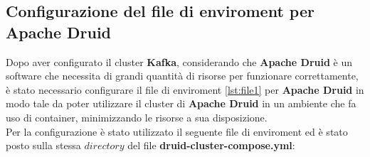 \subsection{Configurazione del file di enviroment per Apache Druid}
Dopo aver configurato il \gls{cluster}{} \textbf{Kafka}, considerando che \textbf{Apache Druid} è un software che necessita di grandi quantità di risorse per funzionare correttamente, è 
stato necessario configurare il file di enviroment \ref{lst:file1} per \textbf{Apache Druid}  in modo tale da poter utilizzare il \gls{cluster}{} di \textbf{Apache Druid} in un ambiente che fa uso di \gls{container}{}, minimizzando le risorse a sua disposizione.\\
Per la configurazione è stato utilizzato il seguente file di enviroment ed è stato posto sulla stessa $directory$ del file \textbf{druid-cluster-compose.yml}:
